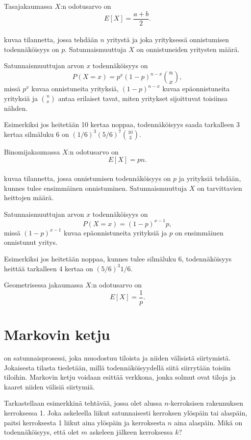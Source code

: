 Tasajakaumassa $X$:n odotusarvo on
\[E[X] = \frac{a+b}{2}.\]
~\\
 kuvaa tilannetta, jossa tehdään $n$
yritystä ja joka yrityksessä onnistumisen
todennäköisyys on $p$. Satunnaismuuttuja $X$
on onnistuneiden yritysten määrä.

Satunnaismuuttujan arvon $x$ todennäköisyys on
\[P(X=x)=p^x (1-p)^{n-x} {n \choose x},\]
missä $p^x$ kuvaa onnistuneita yrityksiä,
$(1-p)^{n-x}$ kuvaa epäonnistuneita yrityksiä
ja ${n \choose x}$ antaa erilaiset tavat,
miten yritykset sijoittuvat toisiinsa nähden.

Esimerkiksi jos heitetään 10 kertaa noppaa,
todennäköisyys saada tarkalleen 3 kertaa silmäluku 6
on $(1/6)^3 (5/6)^7 {10 \choose 3}$.

Binomijakaumassa $X$:n odotusarvo on
\[E[X] = pn.\]
~\\
 kuvaa tilannetta,
jossa onnistumisen todennäköisyys on $p$
ja yrityksiä tehdään, kunnes tulee ensimmäinen
onnistuminen. Satunnaismuuttuja $X$ on
tarvittavien heittojen määrä.

Satunnaismuuttujan arvon $x$ todennäköisyys on
\[P(X=x)=(1-p)^{x-1} p,\]
missä $(1-p)^{x-1}$ kuvaa epäonnistuneita yrityksiä ja
$p$ on ensimmäinen onnistunut yritys.

Esimerkiksi jos heitetään noppaa,
kunnes tulee silmäluku 6, todennäköisyys
heittää tarkalleen 4 kertaa on $(5/6)^3 1/6$.

Geometrisessa jakaumassa $X$:n odotusarvo on
\[E[X]=\frac{1}{p}.\]

\section{Markovin ketju}


 on satunnaisprosessi,
joka muodostuu tiloista ja niiden välisistä siirtymistä.
Jokaisesta tilasta tiedetään, millä todennäköisyydellä
siitä siirrytään toisiin tiloihin.
Markovin ketju voidaan esittää verkkona,
jonka solmut ovat tiloja
ja kaaret niiden välisiä siirtymiä.

Tarkastellaan esimerkkinä tehtävää,
jossa olet alussa $n$-kerroksisen
rakennuksen kerroksessa 1.
Joka askeleella liikut satunnaisesti
kerroksen ylöspäin tai alaspäin,
paitsi kerroksesta 1 liikut aina ylöspäin
ja kerroksesta $n$ aina alaspäin.
Mikä on todennäköisyys, että olet $m$
askeleen jälkeen kerroksessa $k$?

